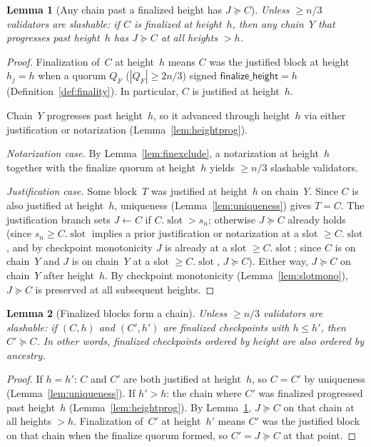 \ifx\litemode\undefined\documentclass{article}\fi
\newcommand{\slot}[0]{\ensuremath{\operatorname{\mathrm{slot}}}}
\theoremstyle{plain}
\newtheorem{lemma}{Lemma}
\theoremstyle{definition}
\theoremstyle{remark}
\begin{document}
\begin{lemma}[Any chain past a finalized height has $J \succeq C$]\label{lem:mainsafety}
Unless $\geq n/3$ validators are slashable: if $C$ is finalized at height~$h$, then any chain~$Y$ that progresses past height~$h$ has $J \succeq C$ at all heights $> h$.
\end{lemma}

\begin{proof}
Finalization of~$C$ at height~$h$ means $C$ was the justified block at height~$h_j = h$ when a quorum $Q_F$ ($|Q_F| \geq 2n/3$) signed $\mathsf{finalize\_height} = h$ (Definition~\ref{def:finality}).
In particular, $C$ is justified at height~$h$.

Chain~$Y$ progresses past height~$h$, so it advanced through height~$h$ via either justification or notarization (Lemma~\ref{lem:heightprog}).

\emph{Notarization case.}
By Lemma~\ref{lem:finexclude}, a notarization at height~$h$ together with the finalize quorum at height~$h$ yields $\geq n/3$ slashable validators.

\emph{Justification case.}
Some block~$T$ was justified at height~$h$ on chain~$Y$.
Since $C$ is also justified at height~$h$, uniqueness (Lemma~\ref{lem:uniqueness}) gives $T = C$.
The justification branch sets $J \gets C$ if $C.\slot > s_n$; otherwise $J \succeq C$ already holds (since $s_n \geq C.\slot$ implies a prior justification or notarization at a slot $\geq C.\slot$, and by checkpoint monotonicity $J$ is already at a slot $\geq C.\slot$; since $C$ is on chain~$Y$ and $J$ is on chain~$Y$ at a slot $\geq C.\slot$, $J \succeq C$).
Either way, $J \succeq C$ on chain~$Y$ after height~$h$.
By checkpoint monotonicity (Lemma~\ref{lem:slotmono}), $J \succeq C$ is preserved at all subsequent heights.
\end{proof}

\begin{lemma}[Finalized blocks form a chain]\label{lem:finchain}
Unless $\geq n/3$ validators are slashable: if $(C, h)$ and $(C', h')$ are finalized checkpoints with $h \leq h'$, then $C' \succeq C$.
In other words, finalized checkpoints ordered by height are also ordered by ancestry.
\end{lemma}

\begin{proof}
If $h = h'$: $C$ and $C'$ are both justified at height~$h$, so $C = C'$ by uniqueness (Lemma~\ref{lem:uniqueness}).
If $h' > h$: the chain where $C'$ was finalized progressed past height~$h$ (Lemma~\ref{lem:heightprog}).
By Lemma~\ref{lem:mainsafety}, $J \succeq C$ on that chain at all heights $> h$.
Finalization of~$C'$ at height~$h'$ means $C'$ was the justified block on that chain when the finalize quorum formed, so $C' = J \succeq C$ at that point.
\end{proof}
\end{document}
